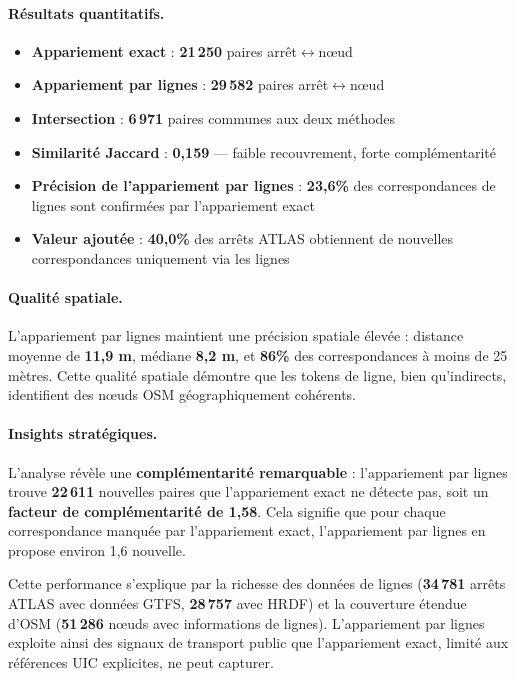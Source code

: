 \paragraph{Résultats quantitatifs.}
\begin{itemize}
  \item \textbf{Appariement exact} : \textbf{21\,250} paires arrêt$\leftrightarrow$nœud
  \item \textbf{Appariement par lignes} : \textbf{29\,582} paires arrêt$\leftrightarrow$nœud
  \item \textbf{Intersection} : \textbf{6\,971} paires communes aux deux méthodes
  \item \textbf{Similarité Jaccard} : \textbf{0,159} — faible recouvrement, forte complémentarité
  \item \textbf{Précision de l'appariement par lignes} : \textbf{23,6\%} des correspondances de lignes sont confirmées par l'appariement exact
  \item \textbf{Valeur ajoutée} : \textbf{40,0\%} des arrêts ATLAS obtiennent de nouvelles correspondances uniquement via les lignes
\end{itemize}

\paragraph{Qualité spatiale.} L'appariement par lignes maintient une précision spatiale élevée : distance moyenne de \textbf{11,9 m}, médiane \textbf{8,2 m}, et \textbf{86\%} des correspondances à moins de 25 mètres. Cette qualité spatiale démontre que les tokens de ligne, bien qu'indirects, identifient des nœuds OSM géographiquement cohérents.

\paragraph{Insights stratégiques.} L'analyse révèle une \textbf{complémentarité remarquable} : l'appariement par lignes trouve \textbf{22\,611} nouvelles paires que l'appariement exact ne détecte pas, soit un \textbf{facteur de complémentarité de 1,58}. Cela signifie que pour chaque correspondance manquée par l'appariement exact, l'appariement par lignes en propose environ 1,6 nouvelle.

Cette performance s'explique par la richesse des données de lignes (\textbf{34\,781} arrêts ATLAS avec données GTFS, \textbf{28\,757} avec HRDF) et la couverture étendue d'OSM (\textbf{51\,286} nœuds avec informations de lignes). L'appariement par lignes exploite ainsi des signaux de transport public que l'appariement exact, limité aux références UIC explicites, ne peut capturer.

